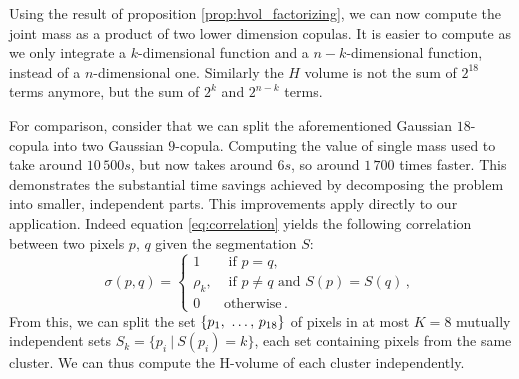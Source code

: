 Using the result of proposition \ref{prop:hvol_factorizing}, we can now compute the joint mass as a product of two lower dimension copulas. It is easier to compute as we only integrate a $k$-dimensional function and a $n-k$-dimensional function, instead of a $n$-dimensional one. Similarly the $H$ volume is not the sum of $2^{18}$ terms anymore, but the sum of $2^{k}$ and $2^{n-k}$ terms.

For comparison, consider that we can split the aforementioned Gaussian $18$-copula into two Gaussian $9$-copula. Computing the value of single mass used to take around $10\,500s$, but now takes around $6s$, so around $1\,700$ times faster. This demonstrates the substantial time savings achieved by decomposing the problem into smaller, independent parts. This improvements apply directly to our application. Indeed equation \eqref{eq:correlation} yields the following correlation between two pixels $p$, $q$ given the segmentation $S$:
\begin{equation*}
    \sigma(p, q) =
    \begin{cases}
        1 &\text{ if }p=q,\\
        \rho_k, &\text{ if } p\ne q\text{ and }S(p)=S(q)\,, \\
        0 & \text{otherwise}\,.
    \end{cases}
\end{equation*}
From this, we can split the set $\{p_1 {, ~\dots, ~} p_{18}\}$ of pixels in at most $K=8$ mutually independent sets $S_k = \{p_i~|~S(p_i)=k\}$, each set containing pixels from the same cluster. We can thus compute the H-volume of each cluster independently.

